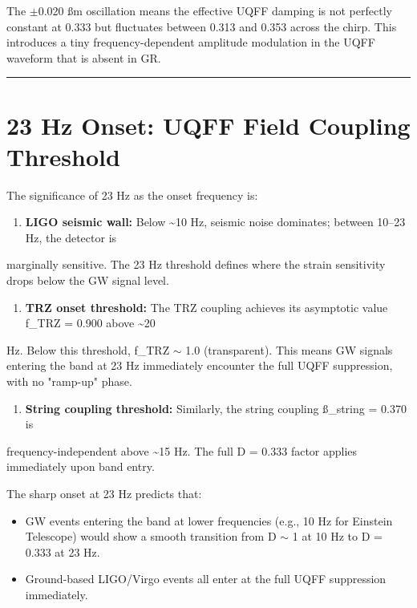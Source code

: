 \documentclass[12pt,a4paper]{article}
\begin{document}
The $\pm$0.020 \ss{}m oscillation means the effective UQFF damping is not perfectly constant at 0.333 but fluctuates between 0.313 and 0.353 across the chirp. This introduces a tiny frequency-dependent amplitude modulation in the UQFF waveform that is absent in GR.

\medskip\hrule\medskip

\section{23 Hz Onset: UQFF Field Coupling Threshold}

The significance of 23 Hz as the onset frequency is:

\begin{enumerate}
  \item \textbf{LIGO seismic wall:} Below \textasciitilde{}10 Hz, seismic noise dominates; between 10--23 Hz, the detector is
\end{enumerate}

marginally sensitive. The 23 Hz threshold defines where the strain sensitivity drops below the GW signal level.

\begin{enumerate}
  \item \textbf{TRZ onset threshold:} The TRZ coupling achieves its asymptotic value f\_TRZ = 0.900 above \textasciitilde{}20
\end{enumerate}

Hz. Below this threshold, f\_TRZ $\sim$ 1.0 (transparent). This means GW signals entering the band at 23 Hz immediately encounter the full UQFF suppression, with no "ramp-up" phase.

\begin{enumerate}
  \item \textbf{String coupling threshold:} Similarly, the string coupling \ss{}\_string = 0.370 is
\end{enumerate}

frequency-independent above \textasciitilde{}15 Hz. The full D = 0.333 factor applies immediately upon band entry.

The sharp onset at 23 Hz predicts that:

\begin{itemize}
  \item GW events entering the band at lower frequencies (e.g., 10 Hz for Einstein Telescope) would show a smooth transition from D $\sim$ 1 at 10 Hz to D = 0.333 at 23 Hz.
  \item Ground-based LIGO/Virgo events all enter at the full UQFF suppression immediately.
\end{itemize}
\end{document}
